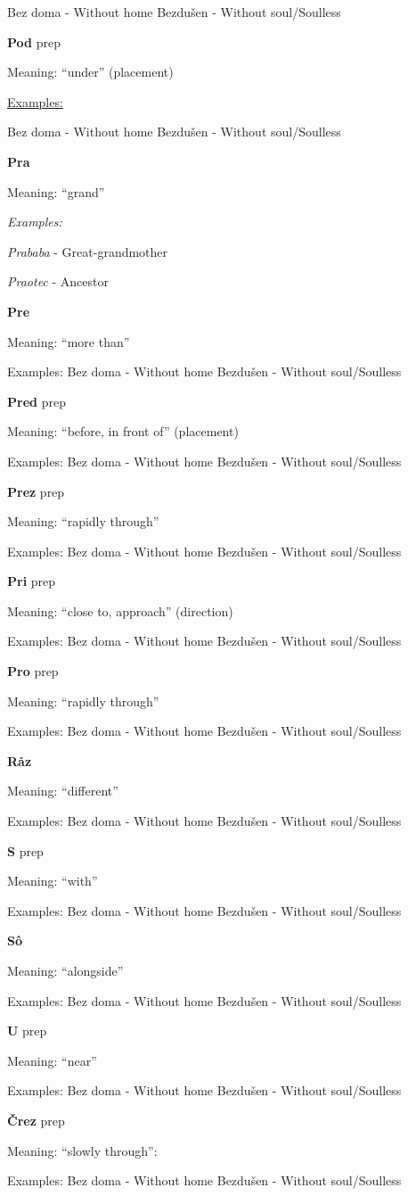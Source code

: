 Bez doma - Without home
Bezdušen - Without soul/Soulless 

\textbf{Pod} \gls{prep}

Meaning: “under” (placement)

\underline{Examples:}



Bez doma - Without home
Bezdušen - Without soul/Soulless 

\textbf{Pra}

Meaning: “grand”

\textit{Examples:}

\textit{Prababa} - Great-grandmother

\textit{Praotec} - Ancestor

\textbf{Pre}

Meaning: “more than”

Examples:
Bez doma - Without home
Bezdušen - Without soul/Soulless 

\textbf{Pred} \gls{prep}

Meaning: “before, in front of” (placement)

Examples:
Bez doma - Without home
Bezdušen - Without soul/Soulless 

\textbf{Prez} \gls{prep}

Meaning: “rapidly through”

Examples:
Bez doma - Without home
Bezdušen - Without soul/Soulless 


\textbf{Pri} \gls{prep}

Meaning: “close to, approach” (direction)

Examples:
Bez doma - Without home
Bezdušen - Without soul/Soulless 

\textbf{Pro} \gls{prep}

Meaning: “rapidly through”

Examples:
Bez doma - Without home
Bezdušen - Without soul/Soulless 

\textbf{Råz}

Meaning: “different”

Examples:
Bez doma - Without home
Bezdušen - Without soul/Soulless 

\textbf{S} \gls{prep}

Meaning: “with”

Examples:
Bez doma - Without home
Bezdušen - Without soul/Soulless 

\textbf{Sô}

Meaning: “alongside”

Examples:
Bez doma - Without home
Bezdušen - Without soul/Soulless 

\textbf{U} \gls{prep}

Meaning: “near”

Examples:
Bez doma - Without home
Bezdušen - Without soul/Soulless 

\textbf{Črez} \gls{prep}

Meaning: “slowly through”:

Examples:
Bez doma - Without home
Bezdušen - Without soul/Soulless 

